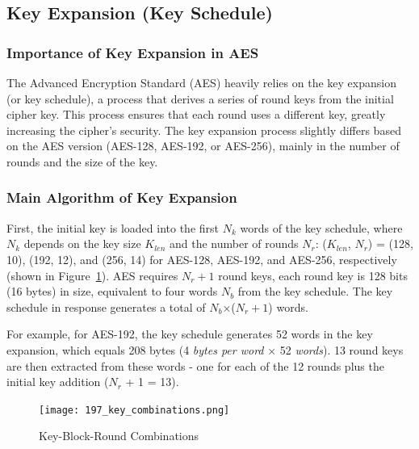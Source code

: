 \subsection{Key Expansion (Key Schedule)}

\subsubsection*{Importance of Key Expansion in AES} 

The Advanced Encryption Standard (AES) heavily relies on the key expansion (or key schedule), 
a process that derives a series of round keys from the initial cipher key. 
This process ensures that each round uses a different key, 
greatly increasing the cipher's security. The key expansion process slightly differs 
based on the AES version (AES-128, AES-192, or AES-256), mainly in the number of rounds 
and the size of the key.

\subsubsection*{Main Algorithm of Key Expansion}

First, the initial key is loaded into the first $N_k$ words of the key schedule, where $N_k$ depends 
on the key size $K_{len}$ and the number of rounds $N_r$: ($K_{len}$, $N_r$) = (128, 10), (192, 12), and (256, 14) 
for AES-128, AES-192, and AES-256, respectively \cite{Key_Collisions} (shown in Figure~\ref{fig:key_comb}). AES requires $N_r+1$ round keys, each round key is 
128 bits (16 bytes) in size, equivalent to four words $N_b$ from the key schedule. The key schedule in 
response generates a total of $N_b$×($N_r+1$) words\cite{NIST_AES}. \newline

For example, for AES-192, the key schedule generates 52 words in the key expansion, which equals 208 bytes (4 \textit{bytes per word} × 52 \textit{words}).
13 round keys are then extracted from these words - one for each of the 12 rounds plus the initial key addition ($N_r$ + 1 = 13).

\begin{figure}[h] %
    \centering
    \texttt{[image: 197\_key\_combinations.png]} %
    \caption{
        Key-Block-Round Combinations \cite{NIST_AES}
    }
    \label{fig:key_comb} %
\end{figure}

